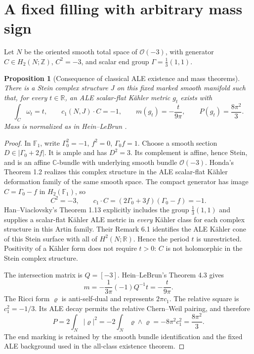 \documentclass[11pt]{article}
\newtheorem{proposition}[theorem]{Proposition}
\begin{document}
\section{A fixed filling with arbitrary mass sign}
Let $N$ be the oriented smooth total space of $\mathcal O(-3)$, with
generator $C\in H_2(N;\mathbb Z)$, $C^2=-3$, and scalar end group
$\Gamma=\frac13(1,1)$.

\begin{proposition}[Consequence of classical ALE existence and mass theorems]
There is a Stein complex structure $J$ on this fixed marked smooth
manifold such that, for every $t\in\mathbb R$, an ALE scalar-flat
K\"ahler metric $g_t$ exists with
\[
 \int_C\omega_t=t,\qquad
 c_1(N,J)\cdot C=-1,\qquad
 m(g_t)=-\frac{t}{9\pi},\qquad
 P(g_t)=\frac{8\pi^2}{3}.
 \tag{2}
\]
Mass is normalized as in Hein--LeBrun \cite{HL}.
\end{proposition}

\begin{proof}
In $\mathbb F_1$, write $\Gamma_0^2=-1$, $f^2=0$, $\Gamma_0f=1$.
Choose a smooth section $D\in|\Gamma_0+2f|$. It is ample and has
$D^2=3$. Its complement is affine, hence Stein, and is an affine
$\mathbb C$-bundle with underlying smooth bundle $\mathcal O(-3)$.
Honda's Theorem 1.2 \cite{Honda} realizes this complex structure in
the ALE scalar-flat K\"ahler deformation family of the same smooth
space. The compact generator has image $C=\Gamma_0-f$ in
$H_2(\mathbb F_1)$, so
\[
 C^2=-3,\qquad
 c_1\cdot C=(2\Gamma_0+3f)(\Gamma_0-f)=-1.
\]
Han--Viaclovsky's Theorem 1.13 \cite{HV} explicitly includes the
group $\frac13(1,1)$ and supplies a scalar-flat K\"ahler ALE metric
in \emph{every} K\"ahler class for each complex structure in this
Artin family. Their Remark 6.1 identifies the ALE K\"ahler cone of
this Stein surface with all of $H^2(N;\mathbb R)$. Hence the period
$t$ is unrestricted. Positivity of a K\"ahler form does not require
$t>0$: $C$ is not holomorphic in the Stein complex structure.

The intersection matrix is $Q=[-3]$. Hein--LeBrun's Theorem 4.3 gives
\[
 m=-\frac1{3\pi}(-1)Q^{-1}t=-\frac{t}{9\pi}.
\]
The Ricci form $\varrho$ is anti-self-dual and represents $2\pi c_1$.
The relative square is $c_1^2=-1/3$. Its ALE decay permits the
relative Chern--Weil pairing, and therefore
\[
 P=2\int_N|\varrho|^2=-2\int_N\varrho\wedge\varrho
   =-8\pi^2c_1^2=\frac{8\pi^2}{3}.
\]
The end marking is retained by the smooth bundle identification and
the fixed ALE background used in the all-class existence theorem.
\end{proof}
\end{document}
